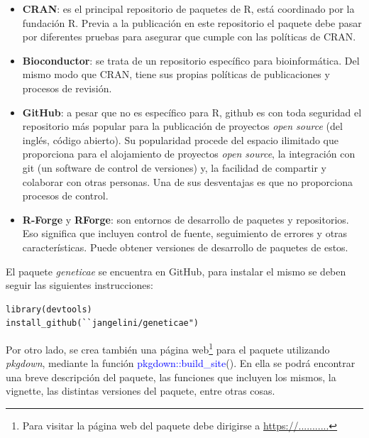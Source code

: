 \begin{itemize}
\item \textbf{CRAN}: es el principal repositorio de paquetes de R, está coordinado por la fundación R. Previa a la publicación en este repositorio el paquete debe pasar por diferentes pruebas para asegurar que cumple con las políticas de CRAN.

\item \textbf{Bioconductor}: se trata de un repositorio específico para bioinformática. Del mismo modo que CRAN, tiene sus propias políticas de publicaciones y procesos de revisión.

\item \textbf{GitHub}: a pesar que no es específico para R, github es con toda seguridad el repositorio más popular para la publicación de proyectos \emph{open source} (del inglés, código abierto). Su popularidad procede del espacio ilimitado que proporciona para el alojamiento de proyectos \emph{open source}, la integración con git (un software de control de versiones) y, la facilidad de compartir y colaborar con otras personas. Una de sus desventajas es que no proporciona procesos de control.

\item \textbf{R-Forge} y \textbf{RForge}: son entornos de desarrollo de paquetes y repositorios. Eso significa que incluyen control de fuente, seguimiento de errores y otras características. Puede obtener versiones de desarrollo de paquetes de estos.
\end{itemize}

El paquete \emph{geneticae} se encuentra en GitHub, para instalar el mismo se deben seguir las siguientes instrucciones:

\begin{lstlisting}
library(devtools)
install_github(``jangelini/geneticae") 
\end{lstlisting}



Por otro lado, se crea también una página web\footnote{Para visitar la página web del paquete debe dirigirse a \url{https://...........}} para el paquete utilizando \emph{pkgdown}, mediante la función \textcolor{blue}{pkgdown::build\_site}(). En ella se podrá encontrar una breve descripción del paquete, las funciones que incluyen los mismos, la vignette, las distintas versiones del paquete, entre otras cosas.  







